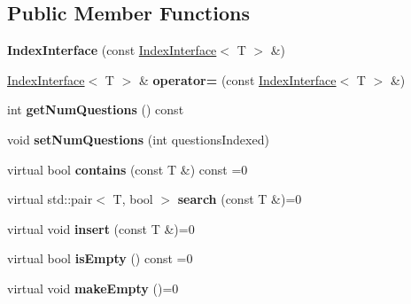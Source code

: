 \subsection*{Public Member Functions}
\begin{DoxyCompactItemize}
\item 
\mbox{\label{classIndexInterface_ae1deeeb263b197a51d01cbf0fb16f966}} 
{\bfseries Index\+Interface} (const \mbox{\hyperlink{classIndexInterface}{Index\+Interface}}$<$ T $>$ \&)
\item 
\mbox{\label{classIndexInterface_a1894dd48debd4093c62a21e5723f4bd2}} 
\mbox{\hyperlink{classIndexInterface}{Index\+Interface}}$<$ T $>$ \& {\bfseries operator=} (const \mbox{\hyperlink{classIndexInterface}{Index\+Interface}}$<$ T $>$ \&)
\item 
\mbox{\label{classIndexInterface_aec8841accbbb89e650037a64ef6bd79a}} 
int {\bfseries get\+Num\+Questions} () const
\item 
\mbox{\label{classIndexInterface_ac39c7591e3c5f61357c24579dfa4d5f3}} 
void {\bfseries set\+Num\+Questions} (int questions\+Indexed)
\item 
\mbox{\label{classIndexInterface_aea1ab18b0ed842716070f3167608c8ae}} 
virtual bool {\bfseries contains} (const T \&) const =0
\item 
\mbox{\label{classIndexInterface_a0338c1316aff03b55aaa929071a267c5}} 
virtual std\+::pair$<$ T, bool $>$ {\bfseries search} (const T \&)=0
\item 
\mbox{\label{classIndexInterface_ad2582c9709ab02cfb10c3f6b2da85b3f}} 
virtual void {\bfseries insert} (const T \&)=0
\item 
\mbox{\label{classIndexInterface_a631cf3bd60a77d52c1c7c53fc520cdad}} 
virtual bool {\bfseries is\+Empty} () const =0
\item 
\mbox{\label{classIndexInterface_a91eb24f76a5c2d14aec1be34fb38e1ac}} 
virtual void {\bfseries make\+Empty} ()=0
\item 

\end{DoxyCompactItemize}
